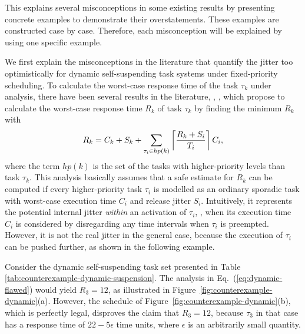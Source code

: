 
\label{sec:misconceptions}

This \mysectionrefnormal{} explains several misconceptions in some existing results by presenting concrete examples to demonstrate their overstatements. These examples are constructed case by case. Therefore, each misconception will be explained by using one specific example. 

\label{sec:wrong-jitter-dynamic}


We first explain the misconceptions in the literature that quantify the jitter too optimistically for dynamic self-suspending
task systems under fixed-priority scheduling. 
To calculate the worst-case response time of the task $\tau_k$ under analysis, there have been several results in the literature, \ie, \cite{ECRTS-AudsleyB04,RTAS-AudsleyB04,RTCSA-KimCPKH95,MingLiRTCSA1994},  which propose to calculate the worst-case response time $R_k$ of task $\tau_k$ by finding the minimum $R_k$ with
\begin{equation}
R_k = C_k+ S_k+\sum_{\tau_i \in hp(k)}\left\lceil{\frac{R_k+S_i}{T_i}}\right\rceil C_i,
\label{eq:dynamic-flawed}
\end{equation}
where the term $hp(k)$ is the set of the tasks with higher-priority levels than task $\tau_k$. 
This analysis basically assumes that a safe estimate for $R_k$ can be computed if
every higher-priority task $\tau_i$ is modelled as an ordinary sporadic
task with worst-case execution time $C_i$ and release jitter $S_i$.
Intuitively, it represents the potential internal jitter \textit{within} an activation of $\tau_i$, \ie, when its execution time $C_i$ is considered by disregarding any time intervals when $\tau_i$ is preempted. 
However, it is not the real jitter in the general case, because the execution of $\tau_i$ can be pushed further, as shown in the following example.


Consider the dynamic self-suspending task set presented in Table \ref{tab:counterexample-dynamic-suspension}. 
The analysis in Eq.~(\ref{eq:dynamic-flawed}) would yield $R_3=12$, as illustrated in 
Figure~\ref{fig:counterexample-dynamic}(a). However, the schedule of Figure~\ref{fig:counterexample-dynamic}(b), which is perfectly legal, 
disproves the claim that $R_3=12$, because $\tau_3$ in that case has a response time of $22-5\epsilon$ time units, 
where $\epsilon$ is an arbitrarily small quantity. 

